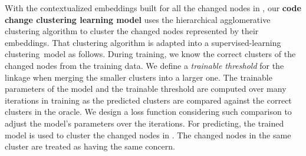 




With the contextualized embeddings built for all the changed nodes in
{\mvpdg}, our {\bf code change clustering learning model} uses the
hierarchical agglomerative clustering algorithm to cluster the changed
nodes represented by their embeddings. That clustering algorithm is
adapted into a supervised-learning clustering~model as follows.
%
During training, we know the correct clusters of the changed
nodes from the training data. We define a {\em trainable threshold}
for the linkage when merging the smaller clusters into a larger
one. The trainable parameters of the model and the trainable threshold
are computed over many iterations in training as the predicted
clusters are compared against the correct clusters in the oracle. We
design a loss function considering such comparison to adjust the
model's parameters over the iterations.  For predicting, the trained
model is used to cluster the changed nodes in {\mvpdg}. The changed
nodes in the same cluster are treated as having the same concern.


